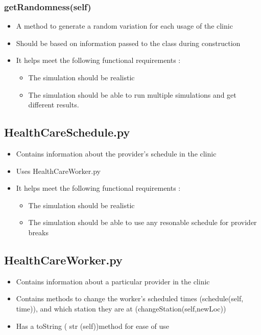 \documentclass[12pt]{article}
\begin{document}
\subsubsection{getRandomness(self)}
\begin{itemize}
	\item A method to generate a random variation for each usage of the clinic
	\item Should be based on information passed to the class during construction
	\item It helps meet the following functional requirements :
	\begin{itemize}
		\item The simulation should be realistic
		\item The simulation should be able to run multiple simulations and get different results.
	\end{itemize}
\end{itemize}

\subsection{HealthCareSchedule.py}
\begin{itemize}  
\item Contains information about the provider's schedule in the clinic
\item Uses HealthCareWorker.py
\item It helps meet the following functional requirements :
\begin{itemize}
	\item The simulation should be realistic
	\item The simulation should be able to use any resonable schedule for provider breaks
\end{itemize}
\end{itemize}

\subsection{HealthCareWorker.py}
\begin{itemize}  
\item Contains information about a particular provider in the clinic
\item Contains methods to change the worker's scheduled times (schedule(self, time)), and which station they are at (changeStation(self,newLoc))
\item Has a toString ( str (self))method for ease of use
\end{itemize}
\end{document}
